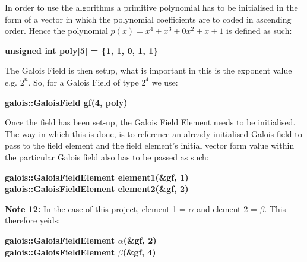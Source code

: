 \documentclass[iwp,first]{luthesis}
\begin{document}
In order to use the algorithms a primitive polynomial has to be initialised in the form of a vector in which the polynomial coefficients are to coded in ascending order. Hence the polynomial $p(x) = x^4 + x^3 + 0x^2 + x + 1$ is defined as such:

\begin{center}

\textbf{unsigned int poly[5] = \{1, 1, 0, 1, 1\}}

\end{center}

The Galois Field is then setup, what is important in this is the exponent value e.g. $2^n$. So, for a Galois Field of type $2^4$ we use:

\begin{center}

\textbf{galois::GaloisField gf(4, poly)}

\end{center}

Once the field has been set-up, the Galois Field Element needs to be initialised. The way in which this is done, is to reference an already initialised Galois field to pass to the field element and the field element's initial vector form value within the particular Galois field also has to be passed as such:

\begin{center}

\textbf{galois::GaloisFieldElement element1(\&gf, 1)}
\\
\textbf{galois::GaloisFieldElement element2(\&gf, 2)}

\end{center}

\textbf{Note 12:} In the case of this project, element 1 = $\alpha$ and element 2 = $\beta$. This therefore yeids:

\begin{center}

\textbf{galois::GaloisFieldElement $\alpha$(\&gf, 2)}
\\
\textbf{galois::GaloisFieldElement $\beta$(\&gf, 4)}

\end{center}
\end{document}
